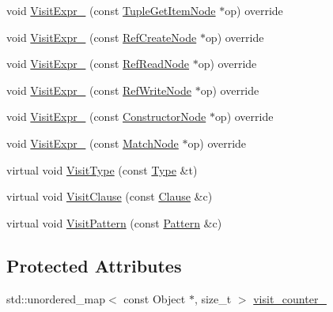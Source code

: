 \begin{DoxyCompactItemize}
\item 
void \hyperlink{classtvm_1_1relay_1_1ExprVisitor_a72b3aeee22ea51f39c36d028d109cddc}{Visit\+Expr\+\_\+} (const \hyperlink{classtvm_1_1relay_1_1TupleGetItemNode}{Tuple\+Get\+Item\+Node} $\ast$op) override
\item 
void \hyperlink{classtvm_1_1relay_1_1ExprVisitor_a52cec47d5e4792dd1cf0f5635ab14fa8}{Visit\+Expr\+\_\+} (const \hyperlink{classtvm_1_1relay_1_1RefCreateNode}{Ref\+Create\+Node} $\ast$op) override
\item 
void \hyperlink{classtvm_1_1relay_1_1ExprVisitor_a8b1ef43d965026767385fb3ee5791928}{Visit\+Expr\+\_\+} (const \hyperlink{classtvm_1_1relay_1_1RefReadNode}{Ref\+Read\+Node} $\ast$op) override
\item 
void \hyperlink{classtvm_1_1relay_1_1ExprVisitor_adeee39855d750554b0e29fdf060a2373}{Visit\+Expr\+\_\+} (const \hyperlink{classtvm_1_1relay_1_1RefWriteNode}{Ref\+Write\+Node} $\ast$op) override
\item 
void \hyperlink{classtvm_1_1relay_1_1ExprVisitor_ab35bcfc19e95fbf444317fae7268f2fd}{Visit\+Expr\+\_\+} (const \hyperlink{namespacetvm_1_1relay_a6b95f70a9b44cc1c96593201594d1345}{Constructor\+Node} $\ast$op) override
\item 
void \hyperlink{classtvm_1_1relay_1_1ExprVisitor_ac0d16449bf87222c9737589d445dd081}{Visit\+Expr\+\_\+} (const \hyperlink{classtvm_1_1relay_1_1MatchNode}{Match\+Node} $\ast$op) override
\item 
virtual void \hyperlink{classtvm_1_1relay_1_1ExprVisitor_aedb15f15752e61bce9e289ac6f2fdace}{Visit\+Type} (const \hyperlink{namespacetvm_1_1relay_a661d95f170bca230773914caeef3fe52}{Type} \&t)
\item 
virtual void \hyperlink{classtvm_1_1relay_1_1ExprVisitor_ab109b327586181cecf76f7b5c562e91b}{Visit\+Clause} (const \hyperlink{classtvm_1_1relay_1_1Clause}{Clause} \&c)
\item 
virtual void \hyperlink{classtvm_1_1relay_1_1ExprVisitor_a8fda55f01b88a56b25770a66ea988152}{Visit\+Pattern} (const \hyperlink{classtvm_1_1relay_1_1Pattern}{Pattern} \&c)
\end{DoxyCompactItemize}
\subsection*{Protected Attributes}
\begin{DoxyCompactItemize}
\item 
std\+::unordered\+\_\+map$<$ const Object $\ast$, size\+\_\+t $>$ \hyperlink{classtvm_1_1relay_1_1ExprVisitor_a27e6d787cccbf7ae04fe53b7b8a62d60}{visit\+\_\+counter\+\_\+}
\end{DoxyCompactItemize}


